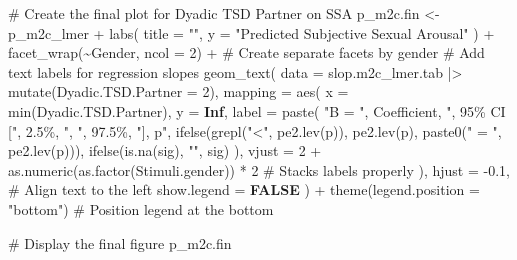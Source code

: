 \documentclass[
  bookmarksnumbered]{article}
\newenvironment{Shaded}{\begin{snugshade}}{\end{snugshade}}
\newcommand{\AttributeTok}[1]{\textcolor[rgb]{0.80,0.80,0.80}{#1}}
\newcommand{\CommentTok}[1]{\textcolor[rgb]{0.50,0.62,0.50}{#1}}
\newcommand{\ConstantTok}[1]{\textcolor[rgb]{0.86,0.64,0.64}{\textbf{#1}}}
\newcommand{\DecValTok}[1]{\textcolor[rgb]{0.86,0.86,0.80}{#1}}
\newcommand{\FloatTok}[1]{\textcolor[rgb]{0.75,0.75,0.82}{#1}}
\newcommand{\FunctionTok}[1]{\textcolor[rgb]{0.94,0.94,0.56}{#1}}
\newcommand{\NormalTok}[1]{\textcolor[rgb]{0.80,0.80,0.80}{#1}}
\newcommand{\OtherTok}[1]{\textcolor[rgb]{0.94,0.94,0.56}{#1}}
\newcommand{\SpecialCharTok}[1]{\textcolor[rgb]{0.86,0.64,0.64}{#1}}
\newcommand{\StringTok}[1]{\textcolor[rgb]{0.80,0.58,0.58}{#1}}
\begin{document}
\begin{Shaded}
\begin{Highlighting}[]
\CommentTok{\# Create the final plot for Dyadic TSD Partner on SSA}
\NormalTok{p\_m2c.fin }\OtherTok{\textless{}{-}}\NormalTok{ p\_m2c\_lmer }\SpecialCharTok{+}
  \FunctionTok{labs}\NormalTok{(}
    \AttributeTok{title =} \StringTok{""}\NormalTok{,}
    \AttributeTok{y =} \StringTok{"Predicted Subjective Sexual Arousal"}
\NormalTok{  ) }\SpecialCharTok{+}
  \FunctionTok{facet\_wrap}\NormalTok{(}\SpecialCharTok{\textasciitilde{}}\NormalTok{Gender, }\AttributeTok{ncol =} \DecValTok{2}\NormalTok{) }\SpecialCharTok{+} \CommentTok{\# Create separate facets by gender}
  \CommentTok{\# Add text labels for regression slopes}
  \FunctionTok{geom\_text}\NormalTok{(}
    \AttributeTok{data =}\NormalTok{ slop.m2c\_lmer.tab }\SpecialCharTok{|\textgreater{}} \FunctionTok{mutate}\NormalTok{(}\AttributeTok{Dyadic.TSD.Partner =} \DecValTok{2}\NormalTok{),}
    \AttributeTok{mapping =} \FunctionTok{aes}\NormalTok{(}
      \AttributeTok{x =} \FunctionTok{min}\NormalTok{(Dyadic.TSD.Partner), }\AttributeTok{y =} \ConstantTok{Inf}\NormalTok{,}
      \AttributeTok{label =} \FunctionTok{paste}\NormalTok{(}
        \StringTok{"B = "}\NormalTok{, Coefficient,}
        \StringTok{", 95\% CI ["}\NormalTok{, }\StringTok{\textasciigrave{}}\AttributeTok{2.5\%}\StringTok{\textasciigrave{}}\NormalTok{, }\StringTok{", "}\NormalTok{, }\StringTok{\textasciigrave{}}\AttributeTok{97.5\%}\StringTok{\textasciigrave{}}\NormalTok{,}
        \StringTok{"], p"}\NormalTok{, }\FunctionTok{ifelse}\NormalTok{(}\FunctionTok{grepl}\NormalTok{(}\StringTok{"\textless{}"}\NormalTok{, }\FunctionTok{pe2.lev}\NormalTok{(p)), }\FunctionTok{pe2.lev}\NormalTok{(p), }\FunctionTok{paste0}\NormalTok{(}\StringTok{" = "}\NormalTok{, }\FunctionTok{pe2.lev}\NormalTok{(p))),}
        \FunctionTok{ifelse}\NormalTok{(}\FunctionTok{is.na}\NormalTok{(sig), }\StringTok{""}\NormalTok{, sig)}
\NormalTok{      ),}
      \AttributeTok{vjust =} \DecValTok{2} \SpecialCharTok{+} \FunctionTok{as.numeric}\NormalTok{(}\FunctionTok{as.factor}\NormalTok{(Stimuli.gender)) }\SpecialCharTok{*} \DecValTok{2} \CommentTok{\# Stacks labels properly}
\NormalTok{    ),}
    \AttributeTok{hjust =} \SpecialCharTok{{-}}\FloatTok{0.1}\NormalTok{, }\CommentTok{\# Align text to the left}
    \AttributeTok{show.legend =} \ConstantTok{FALSE}
\NormalTok{  ) }\SpecialCharTok{+}
  \FunctionTok{theme}\NormalTok{(}\AttributeTok{legend.position =} \StringTok{"bottom"}\NormalTok{) }\CommentTok{\# Position legend at the bottom}

\CommentTok{\# Display the final figure}
\NormalTok{p\_m2c.fin}
\end{Highlighting}
\end{Shaded}
\end{document}
